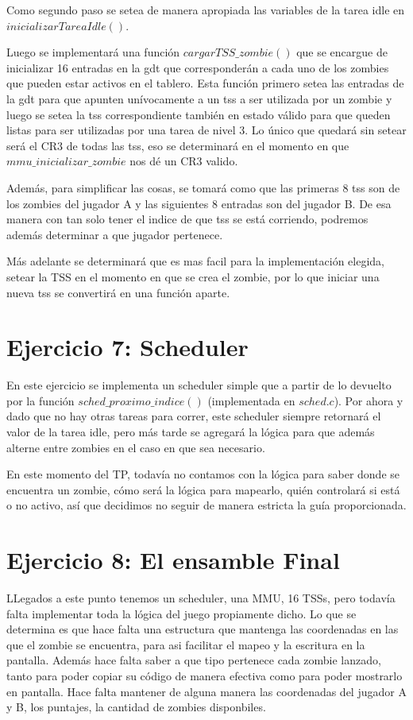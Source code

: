 \documentclass[a4paper]{article}
\begin{document}
Como segundo paso se setea de manera apropiada las variables de la tarea idle en $inicializarTareaIdle()$.

Luego se implementará una función $cargarTSS\_ zombie()$ que se encargue de inicializar 16 entradas en la gdt que corresponderán a cada uno de los zombies que pueden estar activos en el tablero. Esta función primero setea las entradas de la gdt para que apunten unívocamente a un tss a ser utilizada por un zombie y luego se setea la tss correspondiente también en estado válido para que queden listas para ser utilizadas por una tarea de nivel 3. Lo único que quedará sin setear será el CR3 de todas las tss, eso se determinará en el momento en que $mmu\_ inicializar\_ zombie$ nos dé un CR3 valido.

Además, para simplificar las cosas, se tomará como que las primeras 8 tss son de los zombies del jugador A y las siguientes 8 entradas son del jugador B. De esa manera con tan solo tener el indice de que tss se está corriendo, podremos además determinar a que jugador pertenece.

Más adelante se determinará que es mas facil para la implementación elegida, setear la TSS en el momento en que se crea el zombie, por lo que iniciar una nueva tss se convertirá en una función aparte.

\section{Ejercicio 7: Scheduler}

En este ejercicio se implementa un scheduler simple que a partir de lo devuelto por la función $sched\_ proximo\_ indice()$ (implementada en $sched.c$). Por ahora y dado que no hay otras tareas para correr, este scheduler siempre retornará el valor de la tarea idle, pero más tarde se agregará la lógica para que además alterne entre zombies en el caso en que sea necesario.

En este momento del TP, todavía no contamos con la lógica para saber donde se encuentra un zombie, cómo será la lógica para mapearlo, quién controlará si está o no activo, así que decidimos no seguir de manera estricta la guía proporcionada.

\section{Ejercicio 8: El ensamble Final}

LLegados a este punto tenemos un scheduler, una MMU, 16 TSSs, pero todavía falta implementar toda la lógica del juego propiamente dicho. Lo que se determina es que hace falta una estructura que mantenga las coordenadas en las que el zombie se encuentra, para asi facilitar el mapeo y la escritura en la pantalla. Además hace falta saber a que tipo pertenece cada zombie lanzado, tanto para poder copiar su código de manera efectiva como para poder mostrarlo en pantalla. Hace falta mantener de alguna manera las coordenadas del jugador A y B, los puntajes, la cantidad de zombies disponbiles.
\end{document}
